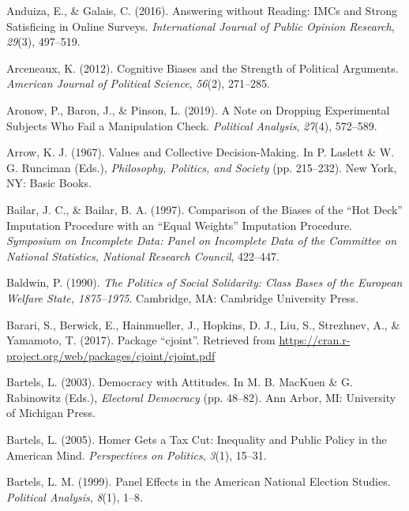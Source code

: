 \documentclass[12pt,econ]{sources/authesis}
\begin{document}
\leavevmode\hypertarget{ref-anduiza_2016_answering}{}%
Anduiza, E., \& Galais, C. (2016). Answering without Reading: IMCs and Strong Satisficing in Online Surveys. \emph{International Journal of Public Opinion Research}, \emph{29}(3), 497--519.

\leavevmode\hypertarget{ref-arceneaux_cognitive_2012}{}%
Arceneaux, K. (2012). Cognitive Biases and the Strength of Political Arguments. \emph{American Journal of Political Science}, \emph{56}(2), 271--285.

\leavevmode\hypertarget{ref-aronow_2019_note}{}%
Aronow, P., Baron, J., \& Pinson, L. (2019). A Note on Dropping Experimental Subjects Who Fail a Manipulation Check. \emph{Political Analysis}, \emph{27}(4), 572--589.

\leavevmode\hypertarget{ref-arrow_1967_values}{}%
Arrow, K. J. (1967). Values and Collective Decision-Making. In P. Laslett \& W. G. Runciman (Eds.), \emph{Philosophy, Politics, and Society} (pp. 215--232). New York, NY: Basic Books.

\leavevmode\hypertarget{ref-bailar_1997_comparison}{}%
Bailar, J. C., \& Bailar, B. A. (1997). Comparison of the Biases of the ``Hot Deck'' Imputation Procedure with an ``Equal Weights'' Imputation Procedure. \emph{Symposium on Incomplete Data: Panel on Incomplete Data of the Committee on National Statistics, National Research Council}, 422--447.

\leavevmode\hypertarget{ref-baldwin_1990_politics}{}%
Baldwin, P. (1990). \emph{The Politics of Social Solidarity: Class Bases of the European Welfare State, 1875--1975}. Cambridge, MA: Cambridge University Press.

\leavevmode\hypertarget{ref-barari_2017_package}{}%
Barari, S., Berwick, E., Hainmueller, J., Hopkins, D. J., Liu, S., Strezhnev, A., \& Yamamoto, T. (2017). Package ``cjoint''. Retrieved from \url{https://cran.r-project.org/web/packages/cjoint/cjoint.pdf}

\leavevmode\hypertarget{ref-bartels_2003_democracy}{}%
Bartels, L. (2003). Democracy with Attitudes. In M. B. MacKuen \& G. Rabinowitz (Eds.), \emph{Electoral Democracy} (pp. 48--82). Ann Arbor, MI: University of Michigan Press.

\leavevmode\hypertarget{ref-bartels_2005_homer}{}%
Bartels, L. (2005). Homer Gets a Tax Cut: Inequality and Public Policy in the American Mind. \emph{Perspectives on Politics}, \emph{3}(1), 15--31.

\leavevmode\hypertarget{ref-bartels_1999_panel}{}%
Bartels, L. M. (1999). Panel Effects in the American National Election Studies. \emph{Political Analysis}, \emph{8}(1), 1--8.
\end{document}
